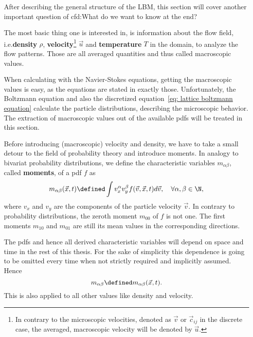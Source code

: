 After describing the general structure of the LBM, this section will cover another important question of \gls{cfd}:\@ What do we want to know at the end?

The most basic thing one is interested in, is information about the flow field, i.e.\@ \textbf{density} $\rho$, \textbf{velocity}\footnote{In contrary to the microscopic velocities, denoted as $\vec{v}$ or $\vec{c}_{ij}$ in the discrete case, the averaged, macroscopic velocity will be denoted by $\vec{u}$.} $\vec{u}$ and \textbf{temperature} $T$ in the domain, to analyze the flow patterns.
Those are all averaged quantities and thus called macroscopic values.

When calculating with the Navier-Stokes equations, getting the macroscopic values is easy, as the equations are stated in exactly those.
Unfortunately, the Boltzmann equation and also the discretized equation~\eqref{eq: lattice boltzmann equation} calculate the particle distributions, describing the microscopic behavior.
The extraction of macroscopic values out of the available \glspl{pdf} will be treated in this section.

Before introducing (macroscopic) velocity and density, we have to take a small detour to the field of probability theory and introduce moments.
In analogy to bivariat probability distributions, we define the characteristic variables $m_{\alpha\beta}$, called \textbf{moments}, of a \gls{pdf} $f$ as
\begin{equation}
  \label{eq: moments continuous}
  m_{\alpha\beta}(\vec{x},t) \defined  \int v_x^\alpha v_y^\beta f(\vec{v},\vec{x},t) d\vec{v},\quad\forall\alpha,\beta\in\N,
\end{equation}
where $v_x$ and $v_y$ are the components of the particle velocity $\vec{v}$.
In contrary to probability distributions, the zeroth moment $m_{00}$ of $f$ is not one.
The first moments $m_{10}$ and $m_{01}$ are still its mean values in the corresponding directions.

The \glspl{pdf} and hence all derived characteristic variables will depend on space and time in the rest of this thesis.
For the sake of simplicity this dependence is going to be omitted every time when not strictly required and implicitly assumed. Hence
\begin{equation}
  \label{eq: leave out x and y}
  m_{\alpha\beta} \defined m_{\alpha\beta}(\vec{x},t).
\end{equation}
This is also applied to all other values like density and velocity.

